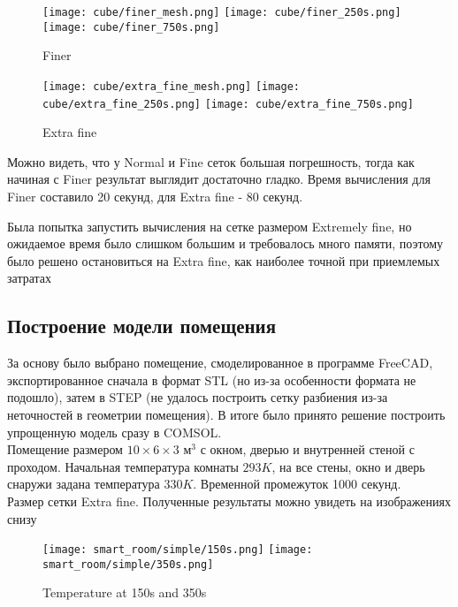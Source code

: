 \begin{figure}[H]
\texttt{[image: cube/finer\_mesh.png]}\hfill
\texttt{[image: cube/finer\_250s.png]}\hfill
\texttt{[image: cube/finer\_750s.png]}\hfill
\caption{Finer}
\label{cube-finer}
\end{figure}

\begin{figure}[H]
\texttt{[image: cube/extra\_fine\_mesh.png]}\hfill
\texttt{[image: cube/extra\_fine\_250s.png]}\hfill
\texttt{[image: cube/extra\_fine\_750s.png]}\hfill
\caption{Extra fine}
\label{cube-extra-fine}
\end{figure}

Можно видеть, что у Normal и Fine сеток большая погрешность, тогда как начиная с Finer результат выглядит достаточно гладко. Время вычисления для Finer составило 20 секунд, для Extra fine - 80 секунд.\par
Была попытка запустить вычисления на сетке размером Extremely fine, но ожидаемое время было слишком большим и требовалось много памяти, поэтому было решено остановиться на Extra fine, как наиболее точной при приемлемых затратах

\newpage


\subsection{Построение модели помещения}

За основу было выбрано помещение, смоделированное в программе FreeCAD, экспортированное сначала в формат STL (но из-за особенности формата не подошло), затем в STEP (не удалось построить сетку разбиения из-за неточностей в геометрии помещения). 
В итоге было принято решение построить упрощенную модель сразу в COMSOL.\\
Помещение размером $10 \times 6 \times 3 \text{ м}^3$ с окном, дверью и внутренней стеной с проходом. 
Начальная температура комнаты $293K$, на все стены, окно и дверь снаружи задана температура $330K$.
Временной промежуток 1000 секунд.\\
Размер сетки Extra fine. 
Полученные результаты можно увидеть на изображениях снизу

\begin{figure}[H]
\texttt{[image: smart\_room/simple/150s.png]}\hfill
\texttt{[image: smart\_room/simple/350s.png]}
\caption{Temperature at 150s and 350s}
\end{figure}

